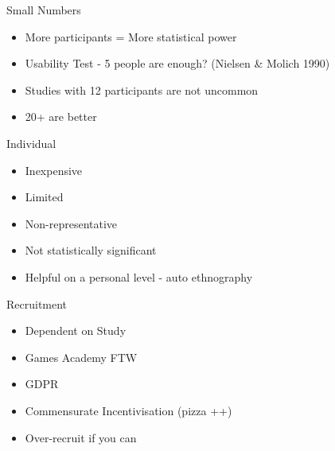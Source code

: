 \begin{frame}{Small Numbers}

\begin{itemize}
\tightlist
\item
  More participants = More statistical power
\item
  Usability Test - 5 people are enough? (Nielsen \& Molich 1990)
\item
  Studies with 12 participants are not uncommon
\item
  20+ are better
\end{itemize}

\end{frame}

\begin{frame}{Individual}

\begin{itemize}
\tightlist
\item
  Inexpensive
\item
  Limited
\item
  Non-representative
\item
  Not statistically significant
\item
  Helpful on a personal level - auto ethnography
\end{itemize}

\end{frame}

\begin{frame}{Recruitment}

\begin{itemize}
\tightlist
\item
  Dependent on Study
\item
  Games Academy FTW
\item
  GDPR
\item
  Commensurate Incentivisation (pizza ++)
\item
  Over-recruit if you can
\end{itemize}

\end{frame}

